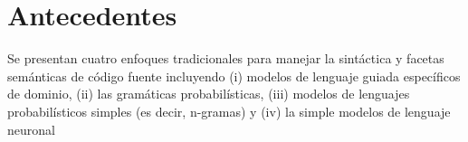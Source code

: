 \section{Antecedentes}
Se presentan cuatro enfoques tradicionales para manejar
la sintáctica y facetas semánticas de código fuente incluyendo
(i) modelos de lenguaje guiada específicos de dominio,
(ii) las gramáticas probabilísticas,
(iii) modelos de lenguajes probabilísticos simples (es decir, n-gramas)
y (iv) la simple modelos de lenguaje neuronal